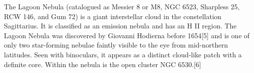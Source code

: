 The Lagoon Nebula (catalogued as Messier 8 or M8, NGC 6523, Sharpless 25, RCW 146, and Gum 72) is a giant interstellar cloud in the constellation Sagittarius. It is classified as an emission nebula and has an H II region. The Lagoon Nebula was discovered by Giovanni Hodierna before 1654[5] and is one of only two star-forming nebulae faintly visible to the eye from mid-northern latitudes. Seen with binoculars, it appears as a distinct cloud-like patch with a definite core. Within the nebula is the open cluster NGC 6530.[6]
